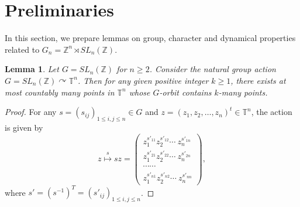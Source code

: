 \documentclass[12pt]{amsart}
\newtheorem{lem}[theorem]{Lemma}
\theoremstyle{definition}
\theoremstyle{remark}
\begin{document}
\section{Preliminaries}\label{section: preliminaries}

In this section, we prepare lemmas on group, character and dynamical properties related to $G_n=\mathbb{Z}^n\rtimes SL_n(\mathbb{Z})$.

\begin{lem}\label{3.1}
Let $G = SL_{n}(\mathbb{Z})$ for $n\ge 2$. Consider the natural group action $G=SL_n(\mathbb{Z})\curvearrowright\mathbb{T}^n$. Then for any given positive integer $k\ge1$, there exists at most countably many  points in $\mathbb{T}^{n}$ whose $G$-orbit contains $k$-many points.
\end{lem}
\begin{proof}
For any $s=(s_{ij})_{1\le i,j \le n}\in G$ and $z=(z_{1}, z_{2},\ldots, z_{n})^{t} \in \mathbb{T}^n$, the action is given by \begin{equation*}
z\overset{s}{\mapsto}sz=
\left(\begin{smallmatrix}
z_{1}^{s'_{11}}z_{2}^{s'_{12}}\cdots\ z_{n}^{s'_{1n}}\\
z_{1}^{s'_{21}}z_{2}^{s'_{22}}\cdots\ z_{n}^{s'_{2n}}\\
 \cdots\cdots\\
z_{1}^{s'_{n1}}z_{2}^{s'_{n2}}\cdots\ z_{n}^{s'_{nn}}
\end{smallmatrix}\right),
\end{equation*}
where $s'=(s^{-1})^{T}=(s'_{ij})_{1\le i,j \le n}$.


\end{proof}
\end{document}
